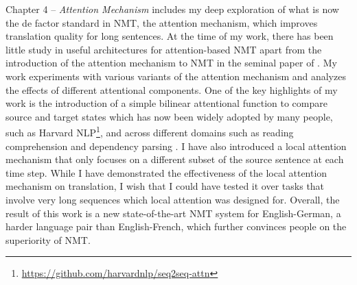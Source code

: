 Chapter 4 -- {\it Attention Mechanism} includes my deep exploration of what is now the de factor standard in NMT, the attention mechanism, which improves translation quality for long sentences. At the time of my work, there has been little study in useful architectures for attention-based NMT apart from the introduction of the attention mechanism to NMT in the seminal paper of . My work experiments with various variants of the attention mechanism and analyzes the effects of different attentional components. One of the key highlights of my work is the introduction of a simple bilinear attentional function to compare source and target states which has now been widely adopted by many people, such as Harvard NLP\footnote{\url{https://github.com/harvardnlp/seq2seq-attn}}, and across different domains such as reading comprehension \cite{chen16} and dependency parsing \cite{dozat16}. I have also introduced a local attention mechanism that only focuses on a different subset of the source sentence at each time step. While I have demonstrated the effectiveness of the local attention mechanism on translation, I wish that I could have tested it over tasks that involve very long sequences which local attention was designed for. Overall, the result of this work is a new state-of-the-art NMT system for English-German, a harder language pair than English-French, which further convinces people on the superiority of NMT.


